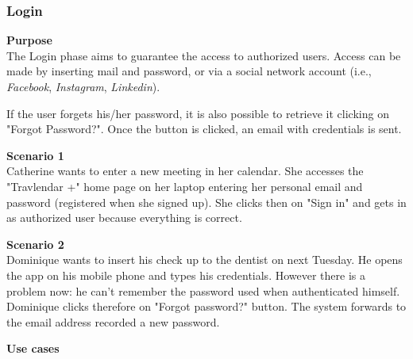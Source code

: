 \documentclass{article}
\begin{document}
	\newpage
	\subsubsection{Login}
	
	\bigskip
	\noindent
	\textbf{Purpose} \\
	The Login phase aims to guarantee the access to authorized users. Access can be made by inserting mail and password, or via a social network account (i.e., \textit{Facebook}, \textit{Instagram}, \textit{Linkedin}).
	
	If the user forgets his/her password, it is also possible to retrieve it clicking on "Forgot Password?". Once the button is clicked, an email with credentials is sent.


	\bigskip
	\noindent
	\textbf{Scenario 1} \\
	Catherine wants to enter a new meeting in her calendar. She accesses the "Travlendar +" home page on her laptop entering her personal email and password (registered when she signed up). She clicks then on "Sign in" and gets in as authorized user because everything is correct.
	
	\bigskip
	\noindent
	\textbf{Scenario 2} \\
	Dominique wants to insert his check up to the dentist on next Tuesday. He opens the app on his mobile phone and types his credentials. However there is a problem now: he can’t remember the password used when authenticated himself. Dominique clicks therefore on "Forgot password?" button. The system forwards to the email address recorded a new password.
	
	\bigskip
	\noindent
	\textbf{Use cases} \\
	
\end{document}
